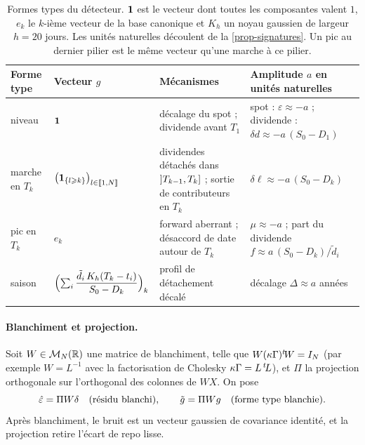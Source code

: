 \begin{table}[ht]
\centering
\caption{Formes types du détecteur. $\mathbf{1}$ est le vecteur dont toutes les composantes valent $1$, $e_k$ le $k$-ième
vecteur de la base canonique et $K_h$ un noyau gaussien de largeur $h=20$ jours. Les unités naturelles découlent de la
\cref{prop-signatures}. Un pic au dernier pilier est le même vecteur qu'une marche à ce pilier.}
\label{tab-templates}
\small
\begin{tabular}{@{}>{\raggedright\arraybackslash}p{1.9cm}>{\raggedright\arraybackslash}p{3.6cm}
>{\raggedright\arraybackslash}p{4.2cm}>{\raggedright\arraybackslash}p{4.0cm}@{}}
\toprule
Forme type & Vecteur $g$ & Mécanismes & Amplitude $a$ en unités naturelles\\
\midrule
niveau & $\mathbf{1}$ & décalage du spot ; dividende avant $T_1$ & spot : $\varepsilon\approx-a$ ;
dividende : $\delta d\approx-a\,(S_0-D_1)$\\
marche en $T_k$ & $\bigl(\mathbf{1}_{\{l\geqslant k\}}\bigr)_{l\in\llbracket 1, N\rrbracket}$ & dividendes détachés dans $\mathopen{]}T_{k-1}, T_k\mathclose{]}$ ;
sortie de contributeurs en $T_k$ & $\delta\ell\approx-a\,(S_0-D_k)$\\
pic en $T_k$ & $e_k$ & forward aberrant ; désaccord de date autour de $T_k$ & $\mu\approx-a$ ; part du dividende
$f\approx a\,(S_0-D_k)/\tilde d_i$\\
saison & $\Bigl(\sum_i\dfrac{\tilde d_i\,K_h(T_k-t_i)}{S_0-D_k}\Bigr)_k$ & profil de détachement décalé & décalage
$\Delta\approx a$ années\\
\bottomrule
\end{tabular}
\end{table}

\paragraph{Blanchiment et projection.} Soit $W\in\mathcal{M}_N(\mathbb{R})$ une matrice de blanchiment, telle que
$W(\kappa\Gamma){}^{t}\!W=I_N$ (par exemple $W=L^{-1}$ avec la factorisation de Cholesky $\kappa\Gamma=L\,{}^{t}\!L$), et
$\Pi$ la projection orthogonale sur l'orthogonal des colonnes de $WX$. On pose
\[
\hat\varepsilon=\Pi W\delta\quad\text{(résidu blanchi)}, \qquad\tilde g=\Pi Wg\quad\text{(forme type blanchie)}.
\]
Après blanchiment, le bruit est un vecteur gaussien de covariance identité, et la projection retire l'écart de repo
lisse.

